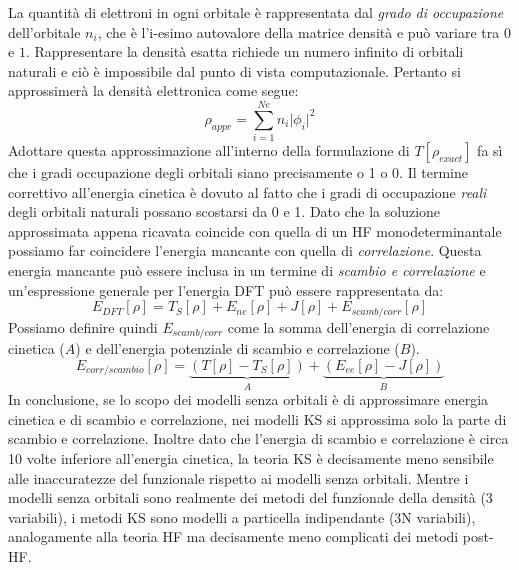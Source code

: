 \documentclass[oneside]{amsbook}
\numberwithin{section}{chapter}
\numberwithin{equation}{section}
\numberwithin{figure}{section}
\begin{document}
La quantità di elettroni in ogni orbitale è rappresentata dal \emph{grado di occupazione} dell'orbitale $n_i$, che è l'i-esimo autovalore della matrice densità e  può variare tra $0$ e $1$. Rappresentare la densità esatta richiede un numero infinito di orbitali naturali e ciò è impossibile dal punto di vista computazionale. Pertanto si approssimerà la densità elettronica come segue:
\begin{equation}
\rho_{appr}= \sum \limits _{i=1}^{Ne} n_i \vert \phi_i \vert ^2
\end{equation}
Adottare questa approssimazione all'interno della formulazione di $T[\rho_{exact}]$ fa sì che i gradi occupazione degli orbitali siano precisamente o 1 o 0. 
Il termine correttivo all'energia cinetica è dovuto al fatto che i gradi di occupazione \emph{reali} degli orbitali naturali possano scostarsi da 0 e 1. Dato che la soluzione approssimata appena ricavata coincide con quella di un HF monodeterminantale possiamo far coincidere l'energia mancante con quella di \emph{correlazione}.
Questa energia mancante può essere inclusa in un termine di \emph{scambio e correlazione} e  un'espressione generale per l'energia DFT può essere rappresentata da:
\begin{equation}
E_{DFT}[\rho] = T_S[\rho]+ E_{ne}[\rho] + J[\rho] + E_{scamb/corr}[\rho]
\end{equation}
Possiamo definire quindi $ E_{scamb/corr}$ come la somma  dell'energia di correlazione cinetica ($A$) e dell'energia potenziale di scambio e correlazione ($B$).
\begin{equation}
E_{corr/scambio}[\rho]  =  \underbrace{(T[\rho]-T_S[\rho])}_A+\underbrace{( E_{ee}[\rho] - J[\rho])}_B
\end{equation}
In conclusione, se lo scopo dei modelli senza orbitali è di approssimare energia cinetica e di scambio e correlazione, nei modelli KS si approssima solo la parte di scambio e correlazione. Inoltre dato che l'energia di scambio e correlazione è circa 10 volte inferiore all'energia cinetica, la teoria KS è decisamente meno sensibile alle inaccuratezze del funzionale rispetto ai modelli senza orbitali. Mentre i modelli senza orbitali sono realmente dei metodi del funzionale della densità (3 variabili), i metodi KS sono modelli a particella indipendante (3N variabili), analogamente alla teoria HF ma decisamente meno complicati dei metodi post-HF.
\end{document}
